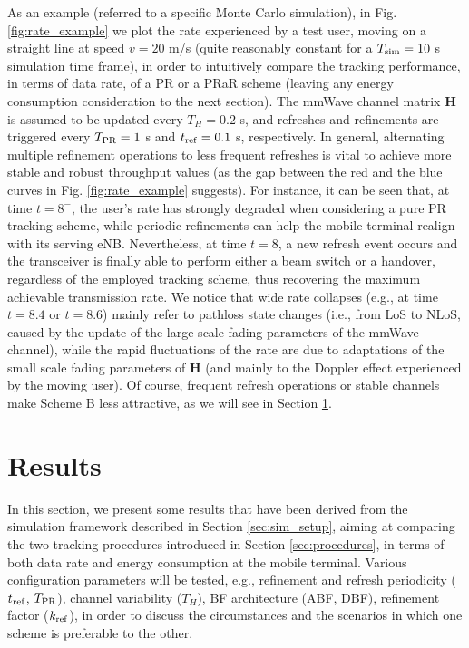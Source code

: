 \documentclass[conference]{IEEEtran}
\begin{document}
As an example (referred to a specific Monte Carlo simulation),  in Fig. \ref{fig:rate_example} we plot the rate experienced by a test user, moving on a straight line  at  speed $v=20$ m/s (quite reasonably constant for a $T_{\rm sim}=10$ s simulation time frame), in order to intuitively
compare the tracking performance, in terms of data rate, of a PR or a PRaR scheme (leaving any energy consumption consideration to the next section).
 The mmWave channel matrix \textbf{H} is assumed to be updated every $T_{H}=0.2$ s, and refreshes and refinements are triggered every $T_{\rm PR}=1$ s and $t_{\rm ref}=0.1$ s, respectively.
In general, alternating multiple refinement operations to less frequent refreshes is vital to achieve more stable and robust throughput values (as the gap between the red and the blue curves in Fig. \ref{fig:rate_example} suggests).
For instance, it can be seen that, at time $t=8^-$, the user's rate has strongly degraded when considering a pure PR tracking scheme, while periodic refinements can help the mobile terminal realign with its serving eNB.
Nevertheless, at time $t=8$, a new refresh event occurs and the transceiver is finally able to  perform either a  beam switch or a handover, regardless of the employed tracking scheme, thus recovering the maximum achievable transmission rate.
We notice that wide rate collapses (e.g., at time $t=8.4$ or $t=8.6$) mainly refer to pathloss state changes (i.e., from LoS to NLoS, caused by the update of the large scale fading parameters of the mmWave channel), while the rapid fluctuations of the rate are due to adaptations of the small scale fading parameters of \textbf{H}  (and mainly to the Doppler effect experienced by the moving user).
Of course, frequent refresh operations or stable channels make  Scheme B less attractive, as we will see in Section \ref{sec:results}.





\section{Results}
\label{sec:results}
In this section, we present some results that have been derived from the simulation framework described in Section 	\ref{sec:sim_setup}, aiming at comparing the two tracking procedures introduced in Section \ref{sec:procedures},  in terms of both data rate and energy consumption at the mobile terminal. 
Various configuration parameters will be tested, e.g., refinement and refresh periodicity ($t_{\rm ref}$, $T_{\rm PR}$), channel variability ($T_H$), BF architecture (ABF, DBF), refinement factor ($k_{\rm ref}$), in order to discuss the circumstances and the scenarios in which one scheme is preferable to the other.
\end{document}
